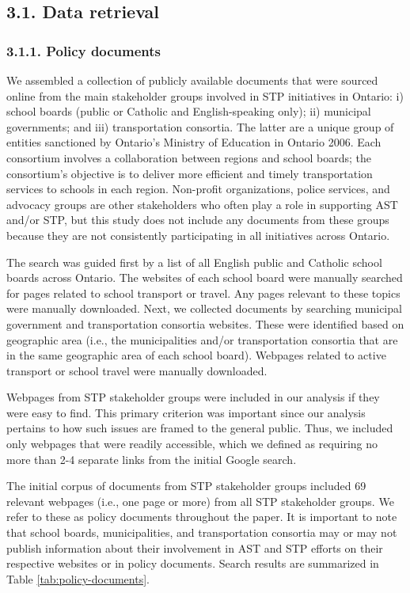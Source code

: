 \documentclass[]{elsarticle} %
\begin{document}
\hypertarget{data-retrieval}{%
\subsection{3.1. Data retrieval}\label{data-retrieval}}

\hypertarget{policy-documents}{%
\subsubsection{3.1.1. Policy documents}\label{policy-documents}}

We assembled a collection of publicly available documents that were
sourced online from the main stakeholder groups involved in STP
initiatives in Ontario: i) school boards (public or Catholic and
English-speaking only); ii) municipal governments; and iii)
transportation consortia. The latter are a unique group of entities
sanctioned by Ontario's Ministry of Education in Ontario 2006. Each
consortium involves a collaboration between regions and school boards;
the consortium's objective is to deliver more efficient and timely
transportation services to schools in each region. Non-profit
organizations, police services, and advocacy groups are other
stakeholders who often play a role in supporting AST and/or STP, but
this study does not include any documents from these groups because they
are not consistently participating in all initiatives across Ontario.

The search was guided first by a list of all English public and Catholic
school boards across Ontario. The websites of each school board were
manually searched for pages related to school transport or travel. Any
pages relevant to these topics were manually downloaded. Next, we
collected documents by searching municipal government and transportation
consortia websites. These were identified based on geographic area
(i.e., the municipalities and/or transportation consortia that are in
the same geographic area of each school board). Webpages related to
active transport or school travel were manually downloaded.

Webpages from STP stakeholder groups were included in our analysis if
they were easy to find. This primary criterion was important since our
analysis pertains to how such issues are framed to the general public.
Thus, we included only webpages that were readily accessible, which we
defined as requiring no more than 2-4 separate links from the initial
Google search.

The initial corpus of documents from STP stakeholder groups included 69
relevant webpages (i.e., one page or more) from all STP stakeholder
groups. We refer to these as policy documents throughout the paper. It
is important to note that school boards, municipalities, and
transportation consortia may or may not publish information about their
involvement in AST and STP efforts on their respective websites or in
policy documents. Search results are summarized in Table
\ref{tab:policy-documents}.
\end{document}
